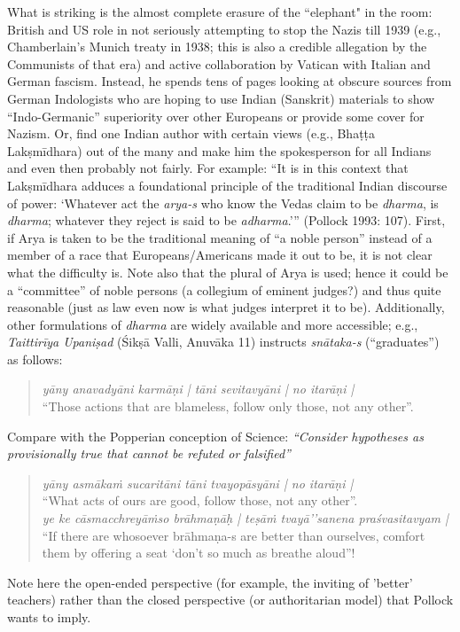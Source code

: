 {\begin{enumerate}
What is striking is the almost complete erasure of the ``elephant" in the room: British and US role in not seriously attempting to stop the Nazis till 1939 (e.g., Chamberlain’s Munich treaty in 1938; this is also a credible allegation by the Communists of that era) and active collaboration by Vatican with Italian and German fascism. Instead, he spends tens of pages looking at obscure sources from German Indologists who are hoping to use Indian (Sanskrit) materials to show “Indo-Germanic” superiority over other Europeans or provide some cover for Nazism. Or, find one Indian author with certain views (e.g., Bhaṭṭa Lakṣmīdhara) out of the many and make him the spokesperson for all Indians and even then probably not fairly. For example: “It is in this context that Lakṣmīdhara adduces a foundational principle of the traditional Indian discourse of power: ‘Whatever act the {\sl arya-s} who know the Vedas claim to be {\sl dharma}, is {\sl dharma}; whatever they reject is said to be {\sl adharma}.’” (Pollock 1993: 107). First, if Arya is taken to be the traditional meaning of “a noble person” instead of a member of a race that Europeans/Americans made it out to be, it is not clear what the difficulty is. Note also that the plural of Arya is used; hence it could be a “committee” of noble persons (a collegium of eminent judges?) and thus quite reasonable (just as law even now is what judges interpret it to be). Additionally, other formulations of {\sl dharma} are widely available and more accessible; e.g., {\sl Taittirīya Upaniṣad} (Śikṣā Valli, Anuvāka 11) instructs {\sl snātaka-s} (“graduates”) as follows:
\begin{quote}
{\sl yāny anavadyāni karmāṇi | tāni sevitavyāni | no itarāṇi |}\\
{\rm “Those actions that are blameless, follow only those, not any other”.}
\end{quote}
Compare with the Popperian conception of Science: {\sl “Consider hypotheses as provisionally true that cannot be refuted or falsified”}
\begin{quote}
{\sl yāny asmākaṁ sucaritāni tāni tvayopāsyāni | no itarāṇi |}\\
“What acts of ours are good, follow those, not any other”.\\[2pt]
{\sl ye ke cāsmacchreyāṁso brāhmaṇāḥ | teṣāṁ tvayā’’sanena praśvasitavyam |}\\
“If there are whosoever brāhmaṇa-s are better than ourselves, comfort them by offering a seat `don't so much as breathe aloud”!
\end{quote}
Note here the open-ended perspective (for example, the inviting of 'better' teachers) rather than the closed perspective (or authoritarian model) that Pollock wants to imply.
\end{enumerate}}


